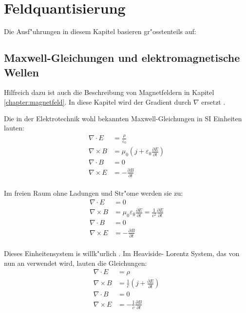 \chapter{Feldquantisierung\label{chapter:feldquantisierung}}
\begin{refsection}

\printbibliography[heading=subbibliography]
\end{refsection}

Die Ausf"uhrungen in diesem Kapitel basieren gr"osstenteils auf: \cite{fq:aqm}

\section{Maxwell-Gleichungen und elektromagnetische Wellen}

Hilfreich dazu ist auch die Beschreibung von Magnetfeldern in Kapitel \ref{chapter:magnetfeld}. In diese Kapitel wird der Gradient durch $\nabla$ ersetzt \cite{fq:nabla}.

Die in der Elektrotechnik wohl bekannten Maxwell-Gleichungen in SI Einheiten lauten:
\begin{equation}
\begin{split}
\nabla\cdot E &= \frac{\rho}{\varepsilon_0} \\
\nabla\times B &= \mu_0( j  + \varepsilon_0\frac{\partial E}{\partial t}) \\
\nabla\cdot B &=0 \\
\nabla\times E &= -\frac{\partial B }{\partial t}\\
\end{split}
\end{equation}

Im freien Raum ohne Ladungen und Str"ome werden sie zu:
\begin{equation}
\begin{split}
\nabla\cdot E &= 0 \\
\nabla\times B &= \mu_0 \varepsilon_0\frac{\partial E}{\partial t} = \frac{1}{c^2} \frac{\partial E}{\partial t}\\
\nabla\cdot B &=0 \\
\nabla\times E &= -\frac{\partial B }{\partial t}\\
\end{split}
\end{equation}

Dieses Einheitensystem is willk"urlich \cite{fq:em_units}. Im Heaviside-
Lorentz System, das von nun an verwendet wird, lauten die Gleichungen:
\begin{equation}
\begin{split}
\nabla\cdot E &= \rho \\
\nabla\times B &= \frac{1}{c}( j  + \frac{\partial E}{\partial t}) \\
\nabla\cdot B &=0 \\
\nabla\times E &= -\frac{1}{c} \frac{\partial B }{\partial t}\\
\end{split}
\end{equation}

